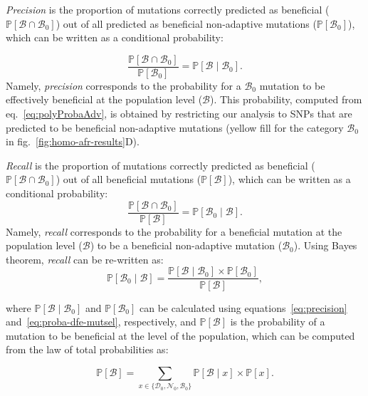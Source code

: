 \documentclass{article}
\newcommand{\proba}{\mathbb{P}}
\newcommand{\SphyDel}{\mathcal{D}_0}
\newcommand{\SphyNeu}{\mathcal{N}_0}
\newcommand{\SphyBen}{\mathcal{B}_0}
\newcommand{\Sphyclass}{x}
\newcommand{\given}{\mid}
\newcommand{\SpopBen}{\mathcal{B}}
\newcommand{\ProbaPopBen}{\proba [ \SpopBen ]}
\begin{document}
    \textit{Precision} is the proportion of mutations correctly predicted as beneficial ($\proba [ \SpopBen \cap  \SphyBen]$) out of all predicted as beneficial non-adaptive mutations ($\proba [ \SphyBen]$), which can be written as a conditional probability:

    \begin{equation}
        \frac{\proba [ \SpopBen  \cap  \SphyBen]}{\proba [ \SphyBen]} = \proba [ \SpopBen \given \SphyBen].
        \label{eq:precision}
    \end{equation}
    Namely, \textit{precision} corresponds to the probability for a $\SphyBen$ mutation to be effectively beneficial at the population level ($\SpopBen$).
    This probability, computed from eq.~\ref{eq:polyProbaAdv}, is obtained by restricting our analysis to SNPs that are predicted to be beneficial non-adaptive mutations (yellow fill for the category $\SphyBen$ in fig.~\ref{fig:homo-afr-results}D).

    \textit{Recall} is the proportion of mutations correctly predicted as beneficial ($\proba [ \SpopBen \cap  \SphyBen]$) out of all beneficial mutations ($\proba [ \SpopBen]$), which can be written as a conditional probability:
    \begin{equation}
        \frac{\proba [ \SpopBen \cap  \SphyBen]}{\proba [ \SpopBen]} = \proba [ \SphyBen  \given \SpopBen ].
    \end{equation}
    Namely, \textit{recall} corresponds to the probability for a beneficial mutation at the population level ($\SpopBen$) to be a beneficial non-adaptive mutation ($\SphyBen$).
    Using Bayes theorem, \textit{recall} can be re-written as:
    \begin{equation}
        \proba [\SphyBen \given \SpopBen] = \frac{\proba [\SpopBen \given \SphyBen] \times \proba[\SphyBen]}{\ProbaPopBen},
        \label{eq:bayes}
    \end{equation}

    where $\proba [\SpopBen \given \SphyBen]$ and $\proba [ \SphyBen ]$ can be calculated using equations~\ref{eq:precision} and~\ref{eq:proba-dfe-mutsel}, respectively, and $\proba [ \SpopBen ]$ is the probability of a mutation to be beneficial at the level of the population, which can be computed from the law of total probabilities as:

    \begin{equation}
        \proba [ \SpopBen ] = \sum_{\Sphyclass \in \{\SphyDel, \SphyNeu, \SphyBen \} }\proba [\SpopBen \given \Sphyclass ] \times \proba [\Sphyclass ].
        \label{eq:total_proba}
    \end{equation}
\end{document}
